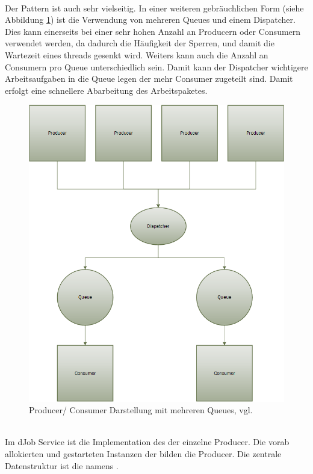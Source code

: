 \\Der Pattern ist auch sehr vielseitig. In einer weiteren gebräuchlichen Form (siehe Abbildung \ref{fig:architecture_2}) ist die Verwendung von mehreren Queues und einem Dispatcher. Dies kann einerseits bei einer sehr hohen Anzahl an Producern oder Consumern verwendet werden, da dadurch die Häufigkeit der Sperren, und damit die Wartezeit eines threads gesenkt wird. Weiters kann auch die Anzahl an Consumern pro Queue unterschiedlich sein. Damit kann der Dispatcher wichtigere Arbeitsaufgaben in die Queue legen der mehr Consumer zugeteilt sind. Damit erfolgt eine schnellere Abarbeitung des Arbeitspaketes.
\begin{figure}
	\centering
	\includegraphics[width=0.7\linewidth]{images/pc_w_dispatcher}
	\caption{Producer/ Consumer Darstellung mit mehreren Queues, vgl. \parencite[S. 163]{jthreads}}
	\label{fig:architecture_2}
\end{figure}
\\Im dJob Service ist die Implementation des  der einzelne Producer. Die vorab allokierten und gestarteten Instanzen der  bilden die Producer. Die zentrale Datenstruktur ist die  namens .
